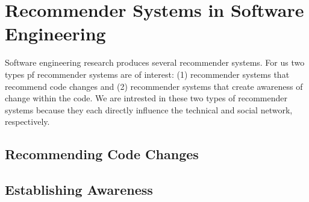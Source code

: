 \section{Recommender Systems in Software Engineering}
Software engineering research produces several recommender systems.
For us two types pf recommender systems are of interest:
(1) recommender systems that recommend code changes
and (2) recommender systems that create awareness of change within the code.
We are intrested in these two types of recommender systems because they each directly influence the technical and social network, respectively.

\subsection{Recommending Code Changes}
\subsection{Establishing Awareness}


